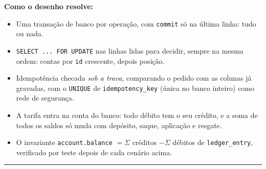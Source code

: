 \documentclass[11pt,a4paper]{article}
\newcommand{\tb}[1]{\texttt{#1}}
\begin{document}
\textbf{Como o desenho resolve:}
\begin{itemize}
  \item Uma transação de banco por operação, com \tb{commit} só na última linha: tudo ou nada.
  \item \tb{SELECT ... FOR UPDATE} nas linhas lidas para decidir, sempre na mesma ordem: contas
        por \tb{id} crescente, depois posição.
  \item Idempotência checada \emph{sob a trava}, comparando o pedido com as colunas já gravadas,
        com o \tb{UNIQUE} de \tb{idempotency_key} (única no banco inteiro) como rede de segurança.
  \item A tarifa entra na conta do banco: todo débito tem o seu crédito, e a soma de todos os
        saldos só muda com depósito, saque, aplicação e resgate.
  \item O invariante \tb{account.balance} $= \Sigma$ créditos $- \Sigma$ débitos de
        \tb{ledger_entry}, verificado por teste depois de cada cenário acima.
\end{itemize}
\hrule
\end{document}
